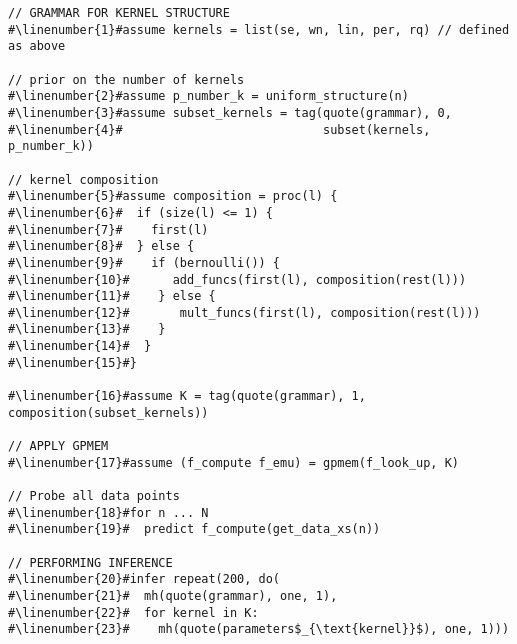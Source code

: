 \begin{mdframed}
\begin{minipage}{\linewidth}
\small
\belowcaptionskip=-10pt
\begin{lstlisting}[mathescape,label=alg:structureVent,basicstyle=\selectfont\ttfamily,numbers=none,escapechar=\#]
// GRAMMAR FOR KERNEL STRUCTURE
#\linenumber{1}#assume kernels = list(se, wn, lin, per, rq) // defined as above

// prior on the number of kernels
#\linenumber{2}#assume p_number_k = uniform_structure(n)
#\linenumber{3}#assume subset_kernels = tag(quote(grammar), 0,
#\linenumber{4}#                            subset(kernels, p_number_k))

// kernel composition
#\linenumber{5}#assume composition = proc(l) {
#\linenumber{6}#  if (size(l) <= 1) {
#\linenumber{7}#    first(l)
#\linenumber{8}#  } else {
#\linenumber{9}#    if (bernoulli()) {
#\linenumber{10}#      add_funcs(first(l), composition(rest(l)))
#\linenumber{11}#    } else {
#\linenumber{12}#       mult_funcs(first(l), composition(rest(l)))
#\linenumber{13}#    }
#\linenumber{14}#  }
#\linenumber{15}#}

#\linenumber{16}#assume K = tag(quote(grammar), 1, composition(subset_kernels))

// APPLY GPMEM
#\linenumber{17}#assume (f_compute f_emu) = gpmem(f_look_up, K)

// Probe all data points
#\linenumber{18}#for n ... N
#\linenumber{19}#  predict f_compute(get_data_xs(n))

// PERFORMING INFERENCE
#\linenumber{20}#infer repeat(200, do(
#\linenumber{21}#  mh(quote(grammar), one, 1),
#\linenumber{22}#  for kernel in K:
#\linenumber{23}#    mh(quote(parameters$_{\text{kernel}}$), one, 1)))
\end{lstlisting}

\end{minipage}
\end{mdframed}
